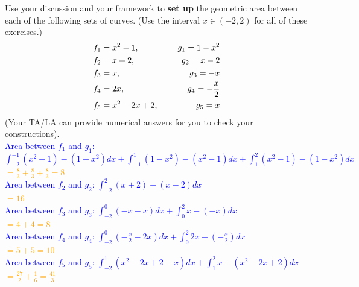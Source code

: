\documentclass{ximera}
\begin{document}
\begin{exercise}
    Use your discussion and your framework to \textbf{set up} the geometric area between each of the following sets of curves. (Use the interval $x\in (-2,2)$ for all of these exercises.) %
    \begin{align}
        f_{1} &= x^2 -1, \hspace{.2in} &g_{1} = 1-x^2 \nonumber \\ 
        f_{2} &= x+2, \hspace{.2in} &g_{2} = x-2 \nonumber\\
        f_{3} &= x, \hspace{.2in} &g_{3}= -x \nonumber\\
        f_{4} &= 2x, \hspace{.2in} &g_{4}= -\frac{x}{2}\nonumber\\
        f_5 &= x^2-2x+2, \hspace{.2in} &g_5 = x \nonumber
    \end{align}
    (Your TA/LA can provide numerical answers for you to check your constructions).\\
    \textcolor{blue}{ Area between $f_1$ and $g_1$: $\int_{-2}^{-1}(x^2-1)-(1-x^2)dx + \int_{-1}^1 (1-x^2)-(x^2-1)dx+\int_1^2 (x^2-1)-(1-x^2)dx$}\\
    \textcolor{orange}{$=\frac83+\frac83 +\frac83=8$}\\
    \textcolor{blue}{
    Area between $f_2$ and $g_2$: $\int_{-2}^2 (x+2)-(x-2)dx$}\\
    \textcolor{orange}{$=16$}\\
    \textcolor{blue}{
    Area between $f_3$ and $g_3$: $\int_{-2}^0 (-x-x)dx+\int_0^2 x-(-x)dx$}\\
    \textcolor{orange}{$=4+4=8$}\\
    \textcolor{blue}{
    Area between $f_4$ and $g_4$: $\int_{-2}^0 (-\frac{x}{2}-2x)dx +\int_0^2 2x-(-\frac{x}{2})dx$}\\
    \textcolor{orange}{$=5+5=10$}\\
    \textcolor{blue}{
    Area between $f_5$ and $g_5$: $\int_{-2}^1 (x^2-2x+2-x)dx+\int_1^2 x-(x^2-2x+2)dx$ }\\
    \textcolor{orange}{$=\frac{27}{2}+\frac16=\frac{41}{3}$}
\end{exercise}
\end{document}
